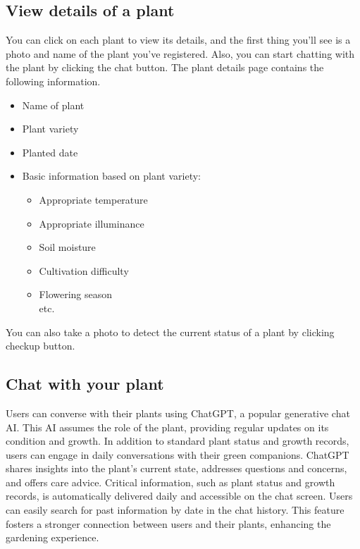 \documentclass[conference, a4paper]{IEEEtran}
\begin{document}
\subsection{View details of a plant}
You can click on each plant to view its details, and the first thing you'll see is a photo and name of the plant you've registered. Also, you can start chatting with the plant by clicking the chat button. The plant details page contains the following information.
\begin{itemize}
    \item Name of plant
    \item Plant variety
    \item Planted date
    \item Basic information based on plant variety:
    \begin{itemize}
        \item Appropriate temperature
        \item Appropriate illuminance
        \item Soil moisture
        \item Cultivation difficulty
        \item Flowering season
        \\etc.
    \end{itemize}
\end{itemize}
You can also take a photo to detect the current status of a plant by clicking checkup button.\\
\subsection{Chat with your plant}
Users can converse with their plants using ChatGPT, a popular generative chat AI. This AI assumes the role of the plant, providing regular updates on its condition and growth. In addition to standard plant status and growth records, users can engage in daily conversations with their green companions. ChatGPT shares insights into the plant's current state, addresses questions and concerns, and offers care advice. Critical information, such as plant status and growth records, is automatically delivered daily and accessible on the chat screen. Users can easily search for past information by date in the chat history. This feature fosters a stronger connection between users and their plants, enhancing the gardening experience.\\
\end{document}
